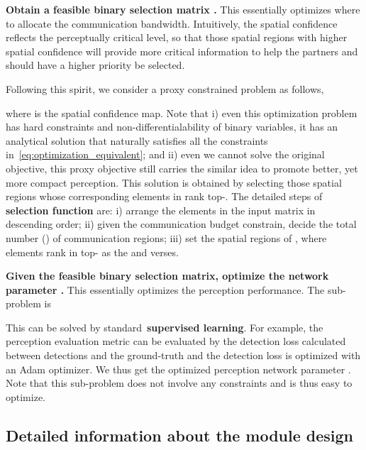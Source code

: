 \documentclass{article}
\begin{document}
 \textbf{Obtain  a feasible binary selection matrix .} This essentially optimizes where to allocate the communication bandwidth. Intuitively, the spatial confidence reflects the perceptually critical level, so that those spatial regions with higher spatial confidence will provide more critical information to help the partners and should have a higher priority be selected.

Following this spirit, we consider a proxy constrained problem as follows,

where  is the spatial confidence map. Note that i) even this optimization problem has hard constraints and non-differentialability of binary variables, it has an analytical solution that naturally satisfies all the constraints in~\eqref{eq:optimization_equivalent}; and ii) even we cannot solve the original objective, this proxy objective still carries the similar idea to promote better, yet more compact perception. This solution is obtained by selecting those spatial regions whose corresponding elements in  rank top-. The detailed steps of \textbf{selection function} are: i) arrange the elements in the input matrix in descending order; ii) given the communication budget constrain, decide the total number () of communication regions; iii) set the spatial regions of , where elements rank in top- as the  and  verses.


 \textbf{Given the feasible binary selection matrix, optimize the network parameter .}  This essentially optimizes the perception performance. The sub-problem is

This can be solved by standard~\textbf{supervised learning}. For example, the perception evaluation metric  can be evaluated by the  detection loss calculated between detections and the ground-truth and the detection loss is optimized with an Adam optimizer. We thus get the optimized perception network parameter . Note that this sub-problem does not involve any constraints and is thus easy to optimize.





\subsection{Detailed information about the module design}
\end{document}
